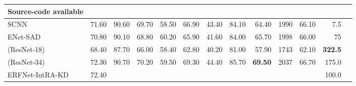 \documentclass[final]{cvpr}
\begin{document}
\begin{table*}
\begin{center}
{\begin{tabular}{@{}lrrrrrrrrrrrr@{}}
                \textbf{Source-code available} &&&&&&&&&&&& \\ \midrule

                SCNN~\cite{scnn}                    & 71.60                             & 90.60                              & 69.70                               & 58.50                                    & 66.90                              & 43.40                               & 84.10                             & 64.40                             & 1990                               & 66.10                             & 7.5                              &                                   \\

                ENet-SAD~\cite{enet-sad}                  & 70.80                             & 90.10                              & 68.80                               & 60.20                                    & 65.90                              & 41.60                               & 84.00                             & 65.70                             & 1998                               & 66.00                             & 75                               &                                   \\

                \cite{ufsa} (ResNet-18)                    & 68.40                             & 87.70                              & 66.00                               & 58.40                                    & 62.80                              & 40.20                               & 81.00                             & 57.90                             & 1743                               & 62.10                             & \textbf{322.5}                              &                                   \\

                \cite{ufsa} (ResNet-34)                    & 72.30                             & 90.70                              & 70.20                               & 59.50                                    & 69.30                              & 44.40                               & 85.70                             & \textbf{69.50}                             & 2037                               & 66.70                             & 175.0                              &                                   \\

                ERFNet-IntRA-KD~\cite{intrakd}      & 72.40                             &                                     &                                      &                                           &                                     &                                      &                                    &                                    &                                    &                                    & 100.0                              &                                   \\


\end{tabular}}
\end{center}
\end{table*}
\end{document}
